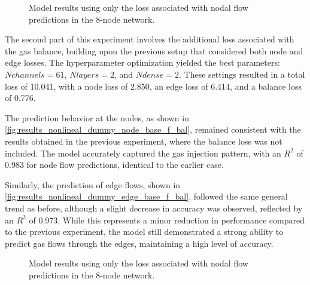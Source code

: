 \begin{figure}
    \centering
    \setlength{}        
    \setlength{} 
    
    \caption{Model results using only the loss associated with nodal flow predictions in the 8-node network.}
    \label{fig:dummy_base_results}
\end{figure}


The second part of this experiment involves the additional loss associated with the gas balance, building upon the previous setup that considered both node and edge losses. The hyperparameter optimization yielded the best parameters: $N channels =61$, $N layers =2$, and $N dense=2$. These settings resulted in a total loss of 10.041, with a node loss of 2.850, an edge loss of 6.414, and a balance loss of 0.776.

The prediction behavior at the nodes, as shown in \cref{fig:results_nonlineal_dummy_node_base_f_bal}, remained consistent with the results obtained in the previous experiment, where the balance loss was not included. The model accurately captured the gas injection pattern, with an $R^2$ of 0.983 for node flow predictions, identical to the earlier case.

Similarly, the prediction of edge flows, shown in \cref{fig:results_nonlineal_dummy_edge_base_f_bal}, followed the same general trend as before, although a slight decrease in accuracy was observed, reflected by an $R^2$ of 0.973. While this represents a minor reduction in performance compared to the previous experiment, the model still demonstrated a strong ability to predict gas flows through the edges, maintaining a high level of accuracy.

\begin{figure}
    \centering
    \setlength{}        
    \setlength{} 
    
    \caption{Model results using only the loss associated with nodal flow predictions in the 8-node network.}
    \label{fig:dummy_base_results}
\end{figure}


